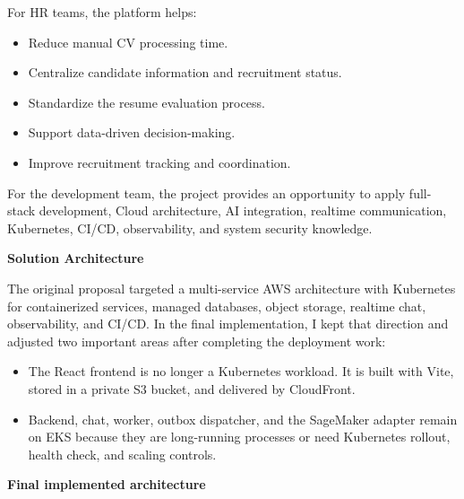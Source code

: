 For HR teams, the platform helps:

\begin{itemize}
\tightlist
\item
  Reduce manual CV processing time.
\item
  Centralize candidate information and recruitment status.
\item
  Standardize the resume evaluation process.
\item
  Support data-driven decision-making.
\item
  Improve recruitment tracking and coordination.
\end{itemize}

For the development team, the project provides an opportunity to apply
full-stack development, Cloud architecture, AI integration, realtime
communication, Kubernetes, CI/CD, observability, and system security
knowledge.

\vspace{0.5em}\noindent\textbf{Solution Architecture}\par

The original proposal targeted a multi-service AWS architecture with
Kubernetes for containerized services, managed databases, object
storage, realtime chat, observability, and CI/CD. In the final
implementation, I kept that direction and adjusted two important areas
after completing the deployment work:

\begin{itemize}
\tightlist
\item
  The React frontend is no longer a Kubernetes workload. It is built
  with Vite, stored in a private S3 bucket, and delivered by CloudFront.
\item
  Backend, chat, worker, outbox dispatcher, and the SageMaker adapter
  remain on EKS because they are long-running processes or need
  Kubernetes rollout, health check, and scaling controls.
\end{itemize}

\vspace{0.5em}\noindent\textbf{Final implemented
architecture}\par

